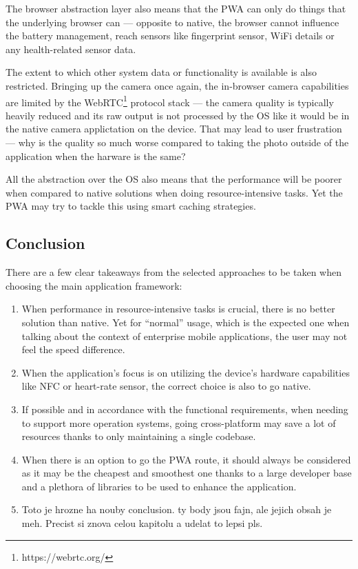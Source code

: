 \documentclass[
  digital,     %
  color,       %
  oneside,     %
  nosansbold,  %
  nocolorbold, %
  lof,         %
  lot,         %
]{fithesis4}
\begin{document}
The browser abstraction layer also means that the PWA can only do things that the underlying browser can --- opposite to native, the browser cannot influence the battery management, reach sensors like fingerprint sensor, WiFi details or any health-related sensor data. 

The extent to which other system data or functionality is available is also restricted. Bringing up the camera once again, the in-browser camera capabilities are limited by the WebRTC\footnote{https://webrtc.org/} protocol stack --- the camera quality is typically heavily reduced and its raw output is not processed by the OS like it would be in the native camera applictation on the device. That may lead to user frustration --- why is the quality so much worse compared to taking the photo outside of the application when the harware is the same? 

All the abstraction over the OS also means that the performance will be poorer when compared to native solutions when doing resource-intensive tasks. Yet the PWA may try to tackle this using smart caching strategies.

\subsection{Conclusion}
There are a few clear takeaways from the selected approaches to be taken when choosing the main application framework:
\begin{enumerate}
  \item When performance in resource-intensive tasks is crucial, there is no better solution than native. Yet for ``normal'' usage, which is the expected one when talking about the context of enterprise mobile applications, the user may not feel the speed difference.
  \item When the application's focus is on utilizing the device's hardware capabilities like NFC or heart-rate sensor, the correct choice is also to go native.
  \item If possible and in accordance with the functional requirements, when needing to support more operation systems, going cross-platform may save a lot of resources thanks to only maintaining a single codebase.
  \item When there is an option to go the PWA route, it should always be considered as it may be the cheapest and smoothest one thanks to a large developer base and a plethora of libraries to be used to enhance the application.
  \item Toto je hrozne ha nouby conclusion. ty body jsou fajn, ale jejich obsah je meh. Precist si znova celou kapitolu a udelat to lepsi pls.
\end{enumerate}
\end{document}
